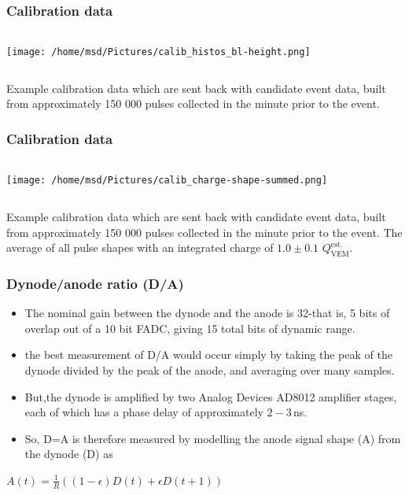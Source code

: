 \documentclass[aspectratio=169]{beamer}
\begin{document}
\begin{frame}
  \frametitle{Calibration data}
  \begin{columns}
    \begin{column}{.8\textwidth}
      \texttt{[image: /home/msd/Pictures/calib\_histos\_bl-height.png]}
    \end{column}
  \end{columns}
  Example calibration data which are sent back with candidate
  event data, built from approximately 150 000 pulses collected
  in the minute prior to the event.
\end{frame}

\begin{frame}
  \frametitle{Calibration data}
  \begin{columns}
    \begin{column}{.6\textwidth}
      \texttt{[image: /home/msd/Pictures/calib\_charge-shape-summed.png]}
    \end{column}
  \end{columns}
  Example calibration data which are sent back with candidate
  event data, built from approximately 150 000 pulses collected
  in the minute prior to the event. The average of all pulse
  shapes with an integrated charge of $1.0\pm0.1$
  $Q^{\mathrm{est.}}_{\mathrm{VEM}}$.
\end{frame}

\begin{frame}
  \frametitle{Dynode/anode ratio (D/A)}
  \begin{itemize}
    \item<1-> The nominal gain between the dynode and the anode
      is 32-that is, 5 bits of overlap out of a 10 bit FADC,
      giving 15 total bits of dynamic range.
    \item<2-> the best measurement of D/A would occur simply by
      taking the peak of the dynode divided by the peak of the
      anode, and averaging over many samples.
    \item<3-> But,the dynode is ampliﬁed by two Analog Devices
      AD8012 ampliﬁer stages, each of which has a phase delay of
      approximately $2-3$\,ns.
    \item<4-> So, D=A is therefore measured by modelling the
      anode signal shape (A) from the dynode (D) as
  \end{itemize}
  \centering
   $ A(t) = \frac{1}{R} ( (1-\epsilon)D(t) + \epsilon D( t+1 ) ) $
\end{frame}
\end{document}
